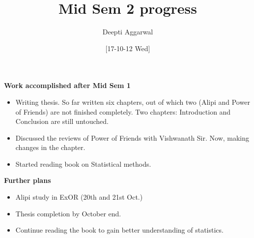 \documentclass[11pt]{article}
\title{Mid Sem 2 progress}
\author{Deepti Aggarwal}
\date{[17-10-12 Wed]}
\begin{document}
\maketitle


\textbf{Work accomplished after Mid Sem 1}
\begin{itemize}
\item Writing thesis. So far written six chapters, out of which two
  (Alipi and Power of Friends) are not finished
  completely. Two chapters: Introduction and Conclusion are still
  untouched. 
\item Discussed the reviews of Power of Friends with Vishwanath
  Sir. Now, making changes in the chapter.
\item Started reading book on Statistical methods.\\
\end{itemize}

\textbf{Further plans}
\begin{itemize}
\item Alipi study in ExOR (20th and 21st Oct.)
\item Thesis completion by October end.
\item Continue reading the book to gain better understanding of statistics.
\end{itemize}
\end{document}
